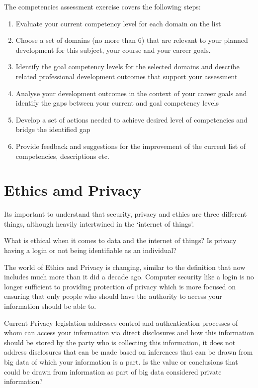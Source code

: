 \documentclass[]{book}
\providecommand{\tightlist}{%
  \setlength{\itemsep}{0pt}\setlength{\parskip}{0pt}}
\theoremstyle{definition}
\theoremstyle{definition}
\theoremstyle{remark}
\begin{document}
The competencies assessment exercise covers the following steps:

\begin{enumerate}
\def\labelenumi{\arabic{enumi}.}
\tightlist
\item
  Evaluate your current competency level for each domain on the list
\item
  Choose a set of domains (no more than 6) that are relevant to your
  planned development for this subject, your course and your career
  goals.
\item
  Identify the goal competency levels for the selected domains and
  describe related professional development outcomes that support your
  assessment
\item
  Analyse your development outcomes in the context of your career goals
  and identify the gaps between your current and goal competency levels
\item
  Develop a set of actions needed to achieve desired level of
  competencies and bridge the identified gap
\item
  Provide feedback and suggestions for the improvement of the current
  list of competencies, descriptions etc.
\end{enumerate}

\section{Ethics amd Privacy}\label{ethics-amd-privacy}

Its important to understand that security, privacy and ethics are three
different things, although heavily intertwined in the `internet of
things'.

What is ethical when it comes to data and the internet of things? Is
privacy having a login or not being identifiable as an individual?

The world of Ethics and Privacy is changing, similar to the definition
that now includes much more than it did a decade ago. Computer security
like a login is no longer sufficient to providing protection of privacy
which is more focused on ensuring that only people who should have the
authority to access your information should be able to.

Current Privacy legislation addresses control and authentication
processes of whom can access your information via direct disclosures and
how this information should be stored by the party who is collecting
this information, it does not address disclosures that can be made based
on inferences that can be drawn from big data of which your information
is a part. Is the value or conclusions that could be drawn from
information as part of big data considered private information?
\end{document}
